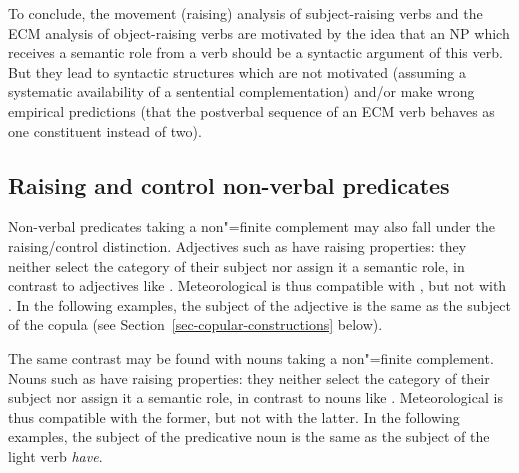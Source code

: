 To conclude, the movement (raising) analysis of subject-raising verbs and the ECM analysis of object-raising verbs are motivated by the idea that an NP which receives a semantic role from a verb should be a syntactic argument of this verb.
But they lead to syntactic structures which are not motivated (assuming a systematic availability of a sentential complementation) and/or make wrong empirical predictions (that the postverbal sequence of an ECM verb behaves as one constituent instead of two).
 
\subsection{Raising and control non-verbal predicates}\label{nonverbal}

Non-verbal predicates taking a non"=finite complement may also fall under the raising/control distinction.  Adjectives such as  have raising properties: they neither select the category of their subject nor assign it a semantic role, in contrast to adjectives like . Meteorological  is thus compatible with , but not with . In the following examples, the subject of the adjective is the same as the subject of the copula (see Section~\ref{sec-copular-constructions} below).
\eal
{}
\zl

The same contrast may be found with  nouns taking a non"=finite complement. Nouns such as  have raising properties: they neither select the category of their subject nor assign it a semantic role, in contrast to nouns like . Meteorological  is thus compatible with the former, but not with the latter. In the following examples, the subject of the predicative noun is the same as the subject of the light verb \emph{have}.
\eal
{}
\zl

